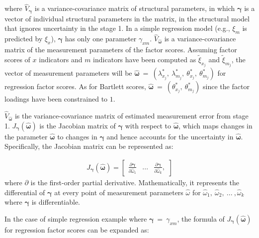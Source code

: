 \documentclass[
  man]{apa7}
\begin{document}
where \(\hat{V}_{\boldsymbol{\gamma}}\) is a variance-covariance matrix of structural parameters, in which \(\boldsymbol{\gamma}\) is a vector of individual structural parameters in the matrix, in the structural model that ignores uncertainty in the stage 1. In a simple regression model (e.g., \(\xi_{m}\) is predicted by \(\xi_{x}\)), \(\boldsymbol{\gamma}\) has only one parameter \(\gamma_{xm}\). \(\hat{V}_{\boldsymbol{\hat{\omega}}}\) is a variance-covariance matrix of the measurement parameters of the factor scores. Assuming factor scores of \(x\) indicators and \(m\) indicators have been computed as \(\tilde{\xi}_{x_{j}}\) and \(\tilde{\xi}_{m_{j}}\), the vector of measurement parameters will be \(\boldsymbol{\hat{\omega}} \ = \ (\lambda_{x_{j}}^\text{*}, \ \lambda_{m_{j}}^\text{*}, \ \theta_{x_{j}}^\text{*}, \ \theta_{m_{j}}^\text{*})\) for regression factor scores. As for Bartlett scores, \(\boldsymbol{\hat{\omega}} \ = \ (\theta_{x_{j}}^\text{*}, \ \theta_{m_{j}}^\text{*})\) since the factor loadings have been constrained to \(1\).

\(\hat{V}_{\boldsymbol{\hat{\omega}}}\) is the variance-covariance matrix of estimated measurement error from stage 1. \(J_{\boldsymbol{\gamma}}(\boldsymbol{\hat{\omega}})\) is the Jacobian matrix of \(\boldsymbol{\gamma}\) with respect to \(\boldsymbol{\hat{\omega}}\), which maps changes in the parameter \(\boldsymbol{\hat{\omega}}\) to changes in \(\boldsymbol{\gamma}\) and hence accounts for the uncertainty in \(\boldsymbol{\hat{\omega}}\). Specifically, the Jacobian matrix can be represented as:

\begin{align}
J_{\boldsymbol{\gamma}}(\boldsymbol{\hat{\omega}}) = 
\begin{bmatrix}
\frac{\partial \boldsymbol{\gamma}}{\partial \hat{\omega}_{1}} &...& \frac{\partial \boldsymbol{\gamma}}{\partial \hat{\omega}_{k}},
\end{bmatrix}
\end{align}
where \(\partial\) is the first-order partial derivative. Mathematically, it represents the differential of \(\boldsymbol{\gamma}\) at every point of measurement parameters \(\hat{\omega}\) for \(\hat{\omega}_{1}, \ \hat{\omega}_{2}, \ ... \ ,\hat{\omega}_{k}\) where \(\boldsymbol{\gamma}\) is differentiable.

In the case of simple regression example where \(\boldsymbol{\gamma} \ = \ \gamma_{xm}\), the formula of \(J_{\boldsymbol{\gamma}}(\boldsymbol{\hat{\omega}})\) for regression factor scores can be expanded as:
\end{document}
